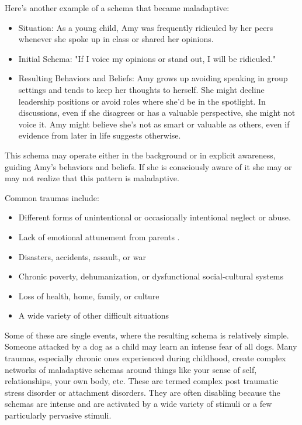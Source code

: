 \documentclass[12pt,letterpaper]{book}
\begin{document}
Here's another example of a schema that became maladaptive:
\begin{itemize}
    \item Situation: As a young child, Amy was frequently ridiculed by her peers whenever she spoke up in class or shared her opinions.
    \item Initial Schema: "If I voice my opinions or stand out, I will be ridiculed."
    \item Resulting Behaviors and Beliefs: Amy grows up avoiding speaking in group settings and tends to keep her thoughts to herself. She might decline leadership positions or avoid roles where she'd be in the spotlight. In discussions, even if she disagrees or has a valuable perspective, she might not voice it. Amy might believe she's not as smart or valuable as others, even if evidence from later in life suggests otherwise.
\end{itemize}
This schema may operate either in the background or in explicit awareness, guiding Amy's behaviors and beliefs. If she is consciously aware of it she may or may not realize that this pattern is maladaptive.

Common traumas include:
\begin{itemize}
    \item Different forms of unintentional or occasionally intentional neglect or abuse.
    \item Lack of emotional attunement from parents \cite{brownAttachmentDisturbances}.
    \item Disasters, accidents, assault, or war
    \item Chronic poverty, dehumanization, or dysfunctional social-cultural systems \cite{roncaStructuralViolence}
    \item Loss of health, home, family, or culture
    \item A wide variety of other difficult situations
\end{itemize}
Some of these are single events, where the resulting schema is relatively simple. Someone attacked by a dog as a child may learn an intense fear of all dogs. Many traumas, especially chronic ones experienced during childhood, create complex networks of maladaptive schemas around things like your sense of self, relationships, your own body, etc. These are termed complex post traumatic stress disorder or attachment disorders. They are often disabling because the schemas are intense and are activated by a wide variety of stimuli or a few particularly pervasive stimuli.
\end{document}
